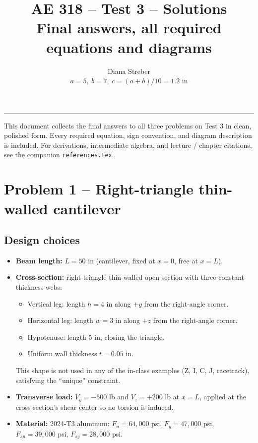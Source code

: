 \documentclass[11pt]{article}
\title{\textbf{AE 318 -- Test 3 -- Solutions}\\\large Final answers, all required equations and diagrams}
\author{Diana Streber\\\small $a = 5,\ b = 7,\ c = (a+b)/10 = 1.2$ in}
\date{}
\begin{document}
\maketitle
\hrule
\vspace{6pt}

This document collects the final answers to all three problems on Test 3 in clean, polished form. Every required equation, sign convention, and diagram description is included. For derivations, intermediate algebra, and lecture / chapter citations, see the companion \texttt{references.tex}.

\section*{Problem 1 -- Right-triangle thin-walled cantilever}

\subsection*{Design choices}

\begin{itemize}[leftmargin=2em, itemsep=1pt]
  \item \textbf{Beam length:} $L = 50$ in (cantilever, fixed at $x = 0$, free at $x = L$).
  \item \textbf{Cross-section:} right-triangle thin-walled open section with three constant-thickness webs:
  \begin{itemize}[leftmargin=2em]
    \item Vertical leg: length $h = 4$ in along $+y$ from the right-angle corner.
    \item Horizontal leg: length $w = 3$ in along $+z$ from the right-angle corner.
    \item Hypotenuse: length $5$ in, closing the triangle.
    \item Uniform wall thickness $t = 0.05$ in.
  \end{itemize}
  This shape is not used in any of the in-class examples (Z, I, C, J, racetrack), satisfying the ``unique'' constraint.
  \item \textbf{Transverse load:} $V_y = -500$ lb and $V_z = +200$ lb at $x = L$, applied at the cross-section's shear center so no torsion is induced.
  \item \textbf{Material:} 2024-T3 aluminum: $F_u = 64{,}000$ psi, $F_y = 47{,}000$ psi, $F_{su} = 39{,}000$ psi, $F_{sy} = 28{,}000$ psi.
\end{itemize}
\end{document}
